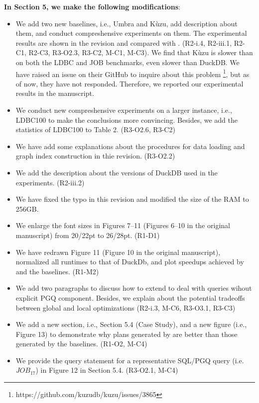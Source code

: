 \textbf{In Section 5, we make the following modifications}:
\begin{itemize}
	\item We add two new baselines, i.e., Umbra and K\`uzu, add description about them, and conduct compreshensive experiments on them. The experimental results are shown in the revision and compared with \name. (R2-i.4, R2-iii.1, R2-C1, R2-C3, R3-O2.3, R3-C2, M-C1, M-C3). We find that K\`uzu is slower than \name on both the LDBC and JOB benchmarks, even slower than DuckDB. We have raised an issue on their GitHub to inquire about this problem \footnote{https://github.com/kuzudb/kuzu/issues/3865}, but as of now, they have not responded. Therefore, we reported our experimental results in the manuscript.
	\item We conduct new compreshensive experiments on a larger instance, i.e., LDBC100 to make the conclusions more convincing. Besides, we add the statistics of LDBC100 to Table 2. (R3-O2.6, R3-C2)
	\item We have add some explanations about the procedures for data loading and graph index construction in thie revision. (R3-O2.2)
	\item We add the description about the versions of DuckDB used in the experiments. (R2-iii.2)
	\item We have fixed the typo in this revision and modified the size of the RAM to 256GB.
	\item We enlarge the font sizes in Figures 7--11 (Figures 6--10 in the original manuscript) from 20/22pt to 26/28pt. (R1-D1)
	\item We have redrawn Figure 11 (Figure 10 in the original manuscript), normalized all runtimes to that of DuckDb, and plot speedups achieved by \name and the baselines. (R1-M2)
	\item We add two paragraphs to discuss how to extend \name to deal with queries wihout explicit PGQ component. Besides, we explain about the potential tradeoffs between global and local optimizations (R2-i.3, M-C6, R3-O3.1, R3-C3)
	\item We add a new section, i.e., Section 5.4 (Case Study), and a new figure (i.e., Figure 13) to demonstrate why plans generated by \name are better than those generated by the baselines. (R1-O2, M-C4)
	\item We provide the query statement for a representative SQL/PGQ query (i.e. $JOB_17$) in Figure 12 in Section 5.4. (R3-O2.1, M-C4)
\end{itemize}


